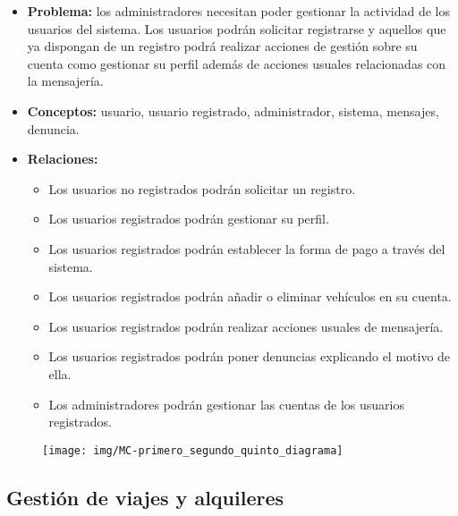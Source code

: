	\begin{itemize}
		\item \textbf{Problema:} los administradores necesitan poder gestionar la actividad de los usuarios del sistema. Los usuarios podrán solicitar registrarse y aquellos que ya dispongan de un registro podrá realizar acciones de gestión sobre su cuenta como gestionar su perfil además de acciones usuales relacionadas con la mensajería.
		\item \textbf{Conceptos:} usuario, usuario registrado, administrador, sistema, mensajes, denuncia.
		\item \textbf{Relaciones: } 
			\begin{itemize}
				\item Los usuarios no registrados podrán solicitar un registro.
				\item Los usuarios registrados podrán gestionar su perfil.
				\item Los usuarios registrados podrán establecer la forma de pago a través del sistema.
				\item Los usuarios registrados podrán añadir o eliminar vehículos en su cuenta.
				\item Los usuarios registrados podrán realizar acciones usuales de mensajería.
				\item Los usuarios registrados podrán poner denuncias explicando el motivo de ella.
				\item Los administradores podrán gestionar las cuentas de los usuarios registrados.
			\end{itemize}
	\end{itemize}
	
	\begin{figure}[H]
		\centering
		\texttt{[image: img/MC-primero\_segundo\_quinto\_diagrama]}
		\label{fig:mc-primerosegundoquintodiagrama}
	\end{figure}

	\subsection{Gestión de viajes y alquileres}
	
